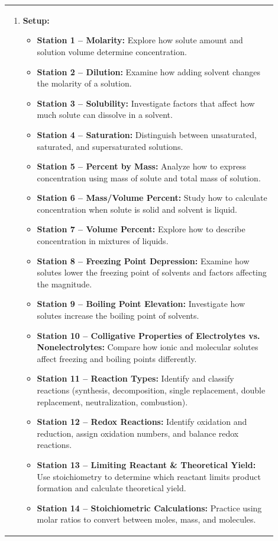 \documentclass{article}
\begin{document}
\begin{tabular}{|p{0.9\linewidth}|}
\begin{minipage}[t]{\linewidth}
\begin{enumerate}
    \item \textbf{Setup:}
        \begin{itemize}
            \item \textbf{Station 1 – Molarity:} Explore how solute amount and solution volume determine concentration.  
            \item \textbf{Station 2 – Dilution:} Examine how adding solvent changes the molarity of a solution.  
            \item \textbf{Station 3 – Solubility:} Investigate factors that affect how much solute can dissolve in a solvent.  
            \item \textbf{Station 4 – Saturation:} Distinguish between unsaturated, saturated, and supersaturated solutions.  
            \item \textbf{Station 5 – Percent by Mass:} Analyze how to express concentration using mass of solute and total mass of solution.  
            \item \textbf{Station 6 – Mass/Volume Percent:} Study how to calculate concentration when solute is solid and solvent is liquid.  
            \item \textbf{Station 7 – Volume Percent:} Explore how to describe concentration in mixtures of liquids.  
            \item \textbf{Station 8 – Freezing Point Depression:} Examine how solutes lower the freezing point of solvents and factors affecting the magnitude.
            \item \textbf{Station 9 – Boiling Point Elevation:} Investigate how solutes increase the boiling point of solvents.  
            \item \textbf{Station 10 – Colligative Properties of Electrolytes vs. Nonelectrolytes:} Compare how ionic and molecular solutes affect freezing and boiling points differently.  
            \item \textbf{Station 11 – Reaction Types:} Identify and classify reactions (synthesis, decomposition, single replacement, double replacement, neutralization, combustion).  
            \item \textbf{Station 12 – Redox Reactions:} Identify oxidation and reduction, assign oxidation numbers, and balance redox reactions.  
            \item \textbf{Station 13 – Limiting Reactant \& Theoretical Yield:} Use stoichiometry to determine which reactant limits product formation and calculate theoretical yield.  
            \item \textbf{Station 14 – Stoichiometric Calculations:} Practice using molar ratios to convert between moles, mass, and molecules.  

\end{itemize}
\end{enumerate}
\end{minipage}
\end{tabular}
\end{document}
